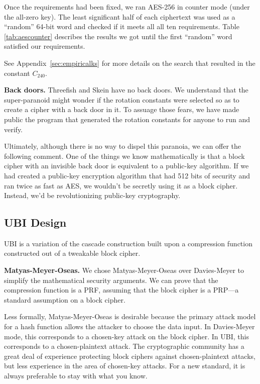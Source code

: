 \documentclass[11pt,twoside]{article}
\newcommand{\TheConst}{C_{240}} %
\begin{document}
Once the requirements had been fixed, we ran AES-256 in counter mode (under
the all-zero key). The least significant half of each ciphertext was used as a 
``random'' 64-bit word and checked if it meets all all ten
requirements. Table \ref{tab:aescounter} describes the results we got
until the first ``random'' word satisfied our requirements.

See Appendix~\ref{sec:empiricalks} for more details on the search that
resulted in the constant $\TheConst$.
 

{\bf Back doors.}  Threefish and Skein have no back doors.  We understand that the super-paranoid might wonder if the rotation constants were selected so as to create a cipher with a back door in it.  To assuage those fears, we have made public the program that generated the rotation constants for anyone to run and verify.

Ultimately, although there is no way to dispel this paranoia, we can offer the following comment. One of the things we know mathematically is that a block cipher with an invisible back door is equivalent to a public-key algorithm. If we had created a public-key encryption algorithm that had 512 bits of security and ran twice as fast as AES, we wouldn't be secretly using it as a block cipher.  Instead, we'd be revolutionizing public-key cryptography.

\subsection{UBI Design}

UBI is a variation of the cascade construction \cite{BCK96b} built upon a compression function constructed out of a tweakable block cipher.

{\bf Matyas-Meyer-Oseas.} We chose Matyas-Meyer-Oseas \cite{MMO85} over Davies-Meyer \cite{MPW,QG} to simplify the mathematical security arguments.  We can prove that the compression function is a PRF, assuming that the block cipher is a PRP---a standard assumption on a block cipher.

Less formally, Matyas-Meyer-Oseas is desirable because the primary attack model for a hash function allows the attacker to choose the data input.  In Davies-Meyer mode, this corresponds to a chosen-key attack on the block cipher.  In UBI, this corresponds to a chosen-plaintext attack.  The cryptographic community has a great deal of experience protecting block ciphers against chosen-plaintext attacks, but less experience in the area of chosen-key attacks.  For a new standard, it is always preferable to stay with what you know.
\end{document}
